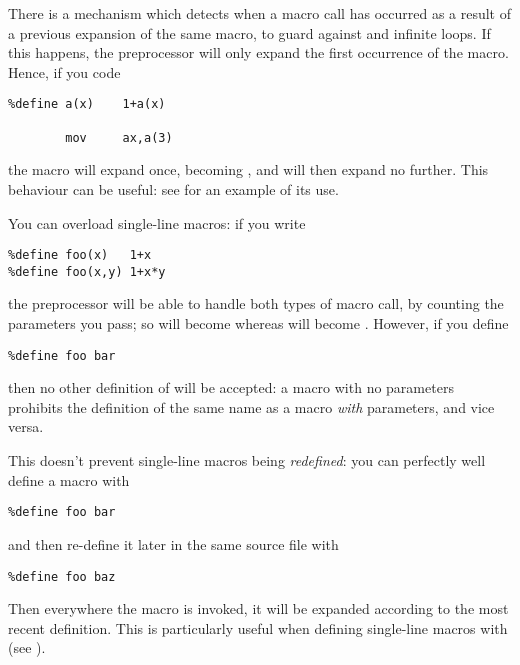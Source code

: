 There is a mechanism which detects when a macro call has occurred as
a result of a previous expansion of the same macro, to guard against
 and infinite loops. If this happens,
the preprocessor will only expand the first occurrence of the macro.
Hence, if you code

\begin{lstlisting}
%define a(x)    1+a(x)

        mov     ax,a(3)
\end{lstlisting}

the macro  will expand once, becoming , and will
then expand no further. This behaviour can be useful: see 
for an example of its use.

You can overload single-line
macros: if you write

\begin{lstlisting}
%define foo(x)   1+x
%define foo(x,y) 1+x*y
\end{lstlisting}

the preprocessor will be able to handle both types of macro call,
by counting the parameters you pass; so  will become
 whereas  will become .
However, if you define

\begin{lstlisting}
%define foo bar
\end{lstlisting}

then no other definition of  will be accepted: a macro with
no parameters prohibits the definition of the same name as a macro
\emph{with} parameters, and vice versa.

This doesn't prevent single-line macros being \emph{redefined}:
you can perfectly well define a macro with

\begin{lstlisting}
%define foo bar
\end{lstlisting}

and then re-define it later in the same source file with

\begin{lstlisting}
%define foo baz
\end{lstlisting}

Then everywhere the macro  is invoked, it will be expanded
according to the most recent definition. This is particularly useful
when defining single-line macros with 
(see ).

